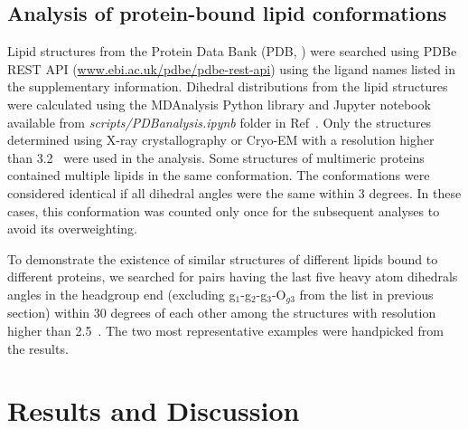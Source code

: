 \documentclass[aps,prl,superscriptaddress,twocolumn]{revtex4}
\begin{document}
\subsection{Analysis of protein-bound lipid conformations}
Lipid structures from the Protein Data Bank (PDB, \cite{berman2000})
were searched using PDBe REST API (\url{www.ebi.ac.uk/pdbe/pdbe-rest-api})
using the ligand names listed in the supplementary information.
Dihedral distributions from the lipid structures were calculated
using the MDAnalysis Python library \cite{agrawal11,gowers16} and
Jupyter notebook available from {\it scripts/PDBanalysis.ipynb} folder in Ref~.
Only the structures determined using X-ray crystallography or Cryo-EM with a resolution higher than 3.2~\text{\AA} were used in the analysis. Some structures of multimeric proteins contained multiple lipids in the same conformation. The conformations were considered identical if all dihedral angles were the same within 3 degrees. In these cases, this conformation was counted only once for the subsequent analyses
to avoid its overweighting.
  
To demonstrate the existence of similar structures of different lipids bound to different proteins, we searched for pairs having the last five heavy atom dihedrals angles in the headgroup end (excluding g$_1$-g$_2$-g$_3$-O$_{g3}$ from the list in previous section) within
30 degrees of each other among the structures with resolution higher than 2.5~\text{\AA}. The two most representative examples
were handpicked from the results.


\section{Results and Discussion}
\end{document}
